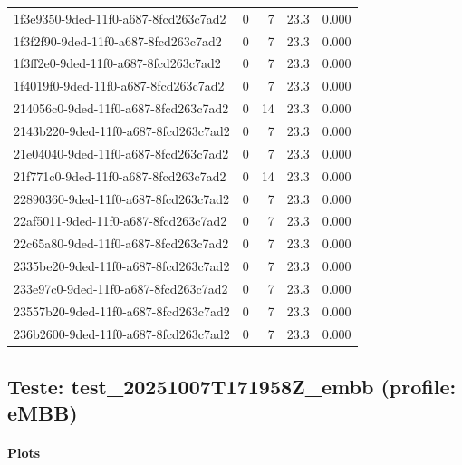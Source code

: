 \begin{longtable}{l r r r r}
1f3e9350-9ded-11f0-a687-8fcd263c7ad2 & 0 & 7 & 23.3 & 0.000 \\

1f3f2f90-9ded-11f0-a687-8fcd263c7ad2 & 0 & 7 & 23.3 & 0.000 \\

1f3ff2e0-9ded-11f0-a687-8fcd263c7ad2 & 0 & 7 & 23.3 & 0.000 \\

1f4019f0-9ded-11f0-a687-8fcd263c7ad2 & 0 & 7 & 23.3 & 0.000 \\

214056c0-9ded-11f0-a687-8fcd263c7ad2 & 0 & 14 & 23.3 & 0.000 \\

2143b220-9ded-11f0-a687-8fcd263c7ad2 & 0 & 7 & 23.3 & 0.000 \\

21e04040-9ded-11f0-a687-8fcd263c7ad2 & 0 & 7 & 23.3 & 0.000 \\

21f771c0-9ded-11f0-a687-8fcd263c7ad2 & 0 & 14 & 23.3 & 0.000 \\

22890360-9ded-11f0-a687-8fcd263c7ad2 & 0 & 7 & 23.3 & 0.000 \\

22af5011-9ded-11f0-a687-8fcd263c7ad2 & 0 & 7 & 23.3 & 0.000 \\

22c65a80-9ded-11f0-a687-8fcd263c7ad2 & 0 & 7 & 23.3 & 0.000 \\

2335be20-9ded-11f0-a687-8fcd263c7ad2 & 0 & 7 & 23.3 & 0.000 \\

233e97c0-9ded-11f0-a687-8fcd263c7ad2 & 0 & 7 & 23.3 & 0.000 \\

23557b20-9ded-11f0-a687-8fcd263c7ad2 & 0 & 7 & 23.3 & 0.000 \\

236b2600-9ded-11f0-a687-8fcd263c7ad2 & 0 & 7 & 23.3 & 0.000 \\

\end{longtable}



\subsection{Teste: test_20251007T171958Z_embb (profile: eMBB)}
\paragraph{Plots}

